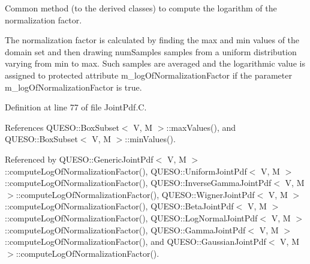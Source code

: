 Common method (to the derived classes) to compute the logarithm of the normalization factor. 

The normalization factor is calculated by finding the max and min values of the domain set and then drawing {\ttfamily num\-Samples} samples from a uniform distribution varying from {\ttfamily min} to {\ttfamily max}. Such samples are averaged and the logarithmic value is assigned to protected attribute m\-\_\-log\-Of\-Normalization\-Factor if the parameter {\ttfamily m\-\_\-log\-Of\-Normalization\-Factor} is true. 

Definition at line 77 of file Joint\-Pdf.\-C.



References Q\-U\-E\-S\-O\-::\-Box\-Subset$<$ V, M $>$\-::max\-Values(), and Q\-U\-E\-S\-O\-::\-Box\-Subset$<$ V, M $>$\-::min\-Values().



Referenced by Q\-U\-E\-S\-O\-::\-Generic\-Joint\-Pdf$<$ V, M $>$\-::compute\-Log\-Of\-Normalization\-Factor(), Q\-U\-E\-S\-O\-::\-Uniform\-Joint\-Pdf$<$ V, M $>$\-::compute\-Log\-Of\-Normalization\-Factor(), Q\-U\-E\-S\-O\-::\-Inverse\-Gamma\-Joint\-Pdf$<$ V, M $>$\-::compute\-Log\-Of\-Normalization\-Factor(), Q\-U\-E\-S\-O\-::\-Wigner\-Joint\-Pdf$<$ V, M $>$\-::compute\-Log\-Of\-Normalization\-Factor(), Q\-U\-E\-S\-O\-::\-Beta\-Joint\-Pdf$<$ V, M $>$\-::compute\-Log\-Of\-Normalization\-Factor(), Q\-U\-E\-S\-O\-::\-Log\-Normal\-Joint\-Pdf$<$ V, M $>$\-::compute\-Log\-Of\-Normalization\-Factor(), Q\-U\-E\-S\-O\-::\-Gamma\-Joint\-Pdf$<$ V, M $>$\-::compute\-Log\-Of\-Normalization\-Factor(), and Q\-U\-E\-S\-O\-::\-Gaussian\-Joint\-Pdf$<$ V, M $>$\-::compute\-Log\-Of\-Normalization\-Factor().


